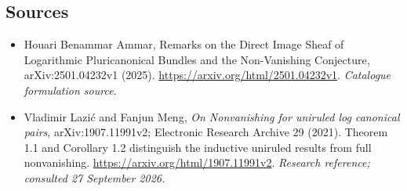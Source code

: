 \documentclass[11pt,a4paper]{article}
\numberwithin{equation}{section}
\begin{document}
\subsection{Sources}
\begin{itemize}\raggedright
\item[\textnormal{[S1]}]\hypertarget{source:30006784:1}{} Houari Benammar Ammar, Remarks on the Direct Image Sheaf of Logarithmic Pluricanonical Bundles and the Non-Vanishing Conjecture, arXiv:2501.04232v1 (2025).
\url{https://arxiv.org/html/2501.04232v1}.
{\small\textit{Catalogue formulation source.}}
\item[\textnormal{[E1]}]\hypertarget{extra:30006784:1}{} Vladimir Lazi\'c and Fanjun Meng, \emph{On Nonvanishing for uniruled log canonical pairs}, arXiv:1907.11991v2; Electronic Research Archive 29 (2021). Theorem 1.1 and Corollary 1.2 distinguish the inductive uniruled results from full nonvanishing.
\url{https://arxiv.org/html/1907.11991v2}.
{\small\textit{Research reference; consulted 27 September 2026.}}
\end{itemize}
\end{document}
